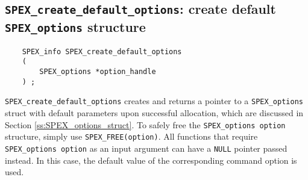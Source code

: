 \documentclass[12pt,oneside]{book}
\theoremstyle{definition}
\begin{document}
\subsection{\texttt{SPEX\_create\_default\_options}: create default \texttt{SPEX\_options} structure}
\label{ss:create_default_options}
\begin{mdframed}[userdefinedwidth=\textwidth]
{\footnotesize
\begin{verbatim}
    SPEX_info SPEX_create_default_options
    (
        SPEX_options *option_handle
    ) ;
\end{verbatim}
} \end{mdframed}

\verb|SPEX_create_default_options| creates and returns a pointer to a
\verb|SPEX_options| struct with default parameters upon successful allocation,
which are discussed in Section \ref{ss:SPEX_options_struct}.  To safely free
the \verb|SPEX_options option| structure, simply use \verb|SPEX_FREE(option)|.
All functions that require \verb|SPEX_options option| as an input argument can
have a \verb'NULL' pointer passed instead. In this case, the default value of
the corresponding command option is used. 
\end{document}
